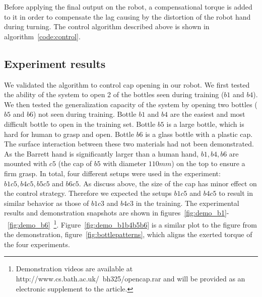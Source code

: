 
Before applying the final output on the robot, a compensational torque is added to it in order to compensate the lag causing by the distortion of the robot hand during turning. The control algorithm described above is shown in algorithm~\ref{code:control}.


\subsection{Experiment results}



We validated the algorithm to control cap opening in our robot. We
first tested the ability of the system to open 2 of the bottles seen
during training ($b1$ and $b4$). We then tested the generalization
capacity of the system by opening two bottles ($b5$ and $b6$) not seen
during training.  Bottle $b1$ and $b4$ are the easiest and most difficult
bottle to open in the training set.  Bottle $b5$ is a large bottle,
which is hard for human to grasp and open. Bottle $b6$ is a glass bottle
with a plastic cap. The surface interaction between these two
materials had not been demonstrated. As the Barrett hand is
significantly larger than a human hand, $b1, b4, b6$ are mounted with
$c5$ (the cap of $b5$ with diameter $110 mm$) on the top to ensure a
firm grasp. In total, four different setups were used in the
experiment: $b1c5, b4c5, b5c5$ and $b6c5$. As discuss above, the size
of the cap has minor effect on the control strategy. Therefore we
expected the setups $b1c5$ and $b4c5$ to result in similar behavior as
those of $b1c3$ and $b4c3$ in the training. The experimental results
and demonstration snapshots are shown in
figures~\ref{fig:demo_b1}-~\ref{fig:demo_b6}~\footnote{Demonstration
  videos are available at http://www.cs.bath.ac.uk/~bh325/opencap.rar
  and will be provided as an electronic supplement to the
  article.}. Figure~\ref{fig:demo_b1b4b5b6} is a similar plot to the
figure from the demonstration, figure~\ref{fig:bottlepatterns}, which
aligns the exerted torque of the four experiments. %

